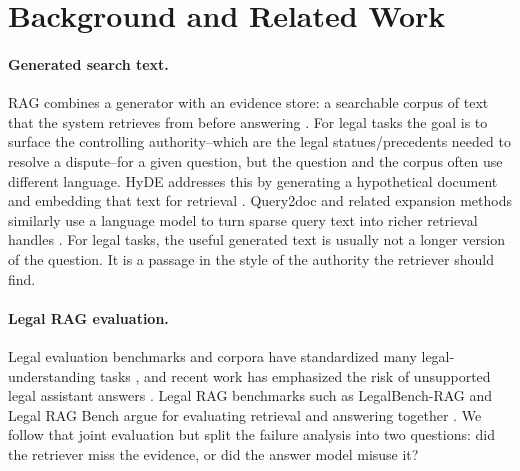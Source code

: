 \section{Background and Related Work}\label{sec:preliminary}

\paragraph{Generated search text.}
RAG combines a generator with an evidence store: a searchable corpus of
text that the system retrieves from before answering \citep{lewis2020rag}.
For legal tasks the goal is to surface the controlling authority--which are the legal statues/precedents needed to resolve a dispute--for a
given question, but the question and the corpus often use different
language. HyDE addresses this by generating a hypothetical document and
embedding that text for retrieval \citep{gao2023hyde}. Query2doc and related expansion methods
similarly use a language model to turn sparse query text into richer retrieval
handles \citep{wang2023query2doc}. For legal tasks, the useful generated text
is usually not a longer version of the question. It is a passage in the style
of the authority the retriever should find.

\paragraph{Legal RAG evaluation.}
Legal evaluation benchmarks and corpora have standardized many
legal-understanding tasks
\citep{guha2023legalbench,chalkidis2022lexglue,henderson2022pileoflaw}, and
recent work has emphasized the risk of unsupported legal assistant answers
\citep{magesh2024hallucinations}. Legal RAG benchmarks such as LegalBench-RAG
and Legal RAG Bench argue for evaluating retrieval and answering together
\citep{pipitone2024legalbenchrag,butler2026legalragbench}. We follow that joint
evaluation but split the failure analysis into two questions: did the
retriever miss the evidence, or did the answer model misuse it?
